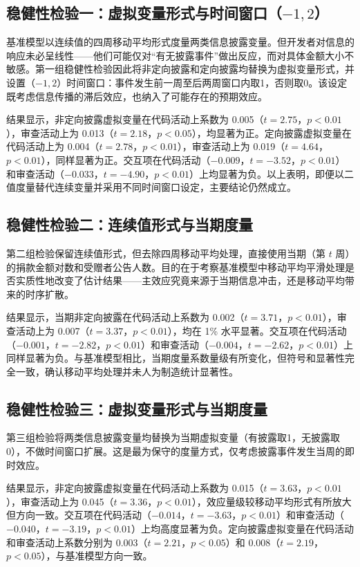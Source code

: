 \subsection{稳健性检验一：虚拟变量形式与时间窗口（$-1, 2$）}

基准模型以连续值的四周移动平均形式度量两类信息披露变量。但开发者对信息的响应未必呈线性——他们可能仅对“有无披露事件”做出反应，而对具体金额大小不敏感。第一组稳健性检验因此将非定向披露和定向披露均替换为虚拟变量形式，并设置（$-1, 2$）时间窗口：事件发生前一周至后两周窗口内取1，否则取0。该设定既考虑信息传播的滞后效应，也纳入了可能存在的预期效应。

结果显示，非定向披露虚拟变量在代码活动上系数为 0.005（$t = 2.75$，$p < 0.01$），审查活动上为 0.013（$t = 2.18$，$p < 0.05$），均显著为正。定向披露虚拟变量在代码活动上为 0.004（$t = 2.78$，$p < 0.01$），审查活动上为 0.019（$t = 4.64$，$p < 0.01$），同样显著为正。交互项在代码活动（$-0.009$，$t = -3.52$，$p < 0.01$）和审查活动（$-0.033$，$t = -4.90$，$p < 0.01$）上均显著为负。以上表明，即便以二值度量替代连续变量并采用不同时间窗口设定，主要结论仍然成立。

\subsection{稳健性检验二：连续值形式与当期度量}

第二组检验保留连续值形式，但去除四周移动平均处理，直接使用当期（第 $t$ 周）的捐款金额对数和受赠者公告人数。目的在于考察基准模型中移动平均平滑处理是否实质性地改变了估计结果——主效应究竟来源于当期信息冲击，还是移动平均带来的时序扩散。

结果显示，当期非定向披露在代码活动上系数为 0.002（$t = 3.71$，$p < 0.01$），审查活动上为 0.007（$t = 3.37$，$p < 0.01$），均在 1\% 水平显著。交互项在代码活动（$-0.001$，$t = -2.82$，$p < 0.01$）和审查活动（$-0.004$，$t = -2.62$，$p < 0.01$）上同样显著为负。与基准模型相比，当期度量系数量级有所变化，但符号和显著性完全一致，确认移动平均处理并未人为制造统计显著性。

\subsection{稳健性检验三：虚拟变量形式与当期度量}

第三组检验将两类信息披露变量均替换为当期虚拟变量（有披露取1，无披露取0），不做时间窗口扩展。这是最为保守的度量方式，仅考虑披露事件发生当周的即时效应。

结果显示，非定向披露虚拟变量在代码活动上系数为 0.015（$t = 3.63$，$p < 0.01$），审查活动上为 0.045（$t = 3.36$，$p < 0.01$），效应量级较移动平均形式有所放大但方向一致。交互项在代码活动（$-0.014$，$t = -3.63$，$p < 0.01$）和审查活动（$-0.040$，$t = -3.19$，$p < 0.01$）上均高度显著为负。定向披露虚拟变量在代码活动和审查活动上系数分别为 0.003（$t = 2.21$，$p < 0.05$）和 0.008（$t = 2.19$，$p < 0.05$），与基准模型方向一致。

